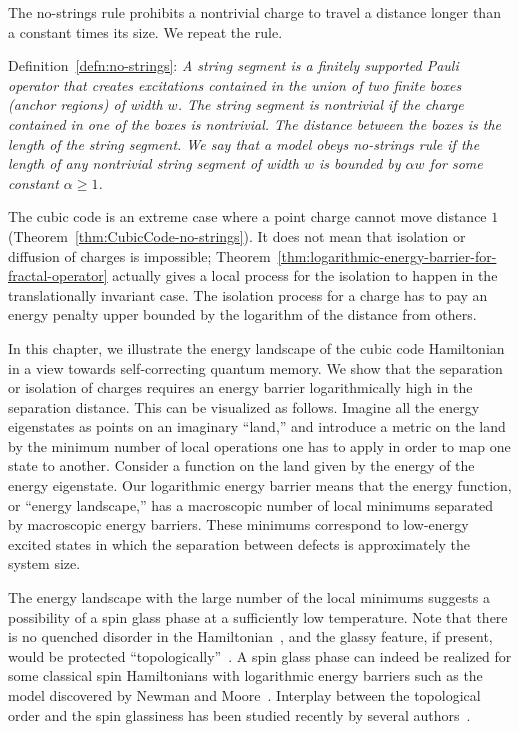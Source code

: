 
The no-strings rule prohibits a nontrivial charge 
to travel a distance longer than a constant times its size.
We repeat the rule.

\begin{center}
\parbox{.8\textwidth}{
Definition~\ref{defn:no-strings}:
{\em
A string segment is a finitely supported Pauli operator
that creates excitations contained in the union of two finite boxes (anchor regions)
of width $w$.
The string segment is nontrivial 
if the charge contained in one of the boxes is nontrivial.
The distance between the boxes is the length of the string segment.
We say that a model obeys no-strings rule
if the length of any nontrivial string segment of width $w$
is bounded by $\alpha w$ for some constant $\alpha \ge 1$.
}}
\end{center}

\noindent
The cubic code is an extreme case where a point charge cannot move distance $1$
(Theorem~\ref{thm:CubicCode-no-strings}).
It does not mean that isolation or diffusion of charges is impossible;
Theorem~\ref{thm:logarithmic-energy-barrier-for-fractal-operator}
actually gives a local process for the isolation to happen in the translationally invariant case.
The isolation process for a charge has to pay an energy penalty 
upper bounded by the logarithm of the distance from others.

In this chapter, we illustrate the energy landscape of the cubic code Hamiltonian
in a view towards self-correcting quantum memory.
We show that the separation or isolation of charges
requires an energy barrier logarithmically high in the separation distance.
This can be visualized as follows.
Imagine all the energy eigenstates as points on an imaginary ``land,''
and introduce a metric on the land by the minimum number of local operations
one has to apply in order to map one state to another.
Consider a function on the land given by the energy of the energy eigenstate.
Our logarithmic energy barrier means that the energy function, or ``energy landscape,''
has a macroscopic number of local minimums separated by macroscopic energy barriers.
These minimums correspond to low-energy excited states 
in which the separation between defects is approximately the system size.

The energy landscape with the large number of the local minimums 
suggests a possibility of a spin glass phase at a sufficiently low temperature.
Note that there is no quenched disorder in the Hamiltonian~\cite{BinderYoung1986SpinGlass,Weissman1993SpinGlass},
and the glassy feature, if present, would be protected ``topologically''~\cite{BravyiHastingsMichalakis2010stability}.
A spin glass phase can indeed be realized for some classical spin Hamiltonians 
with logarithmic energy barriers such as the model discovered by Newman and Moore~\cite{NewmanMoore1999Glassy}.
Interplay between the topological order and the spin glassiness has been studied recently by
several authors~\cite{Chamon2005Quantum,TsomokosOsborneCastelnovo2010Interplay}.

